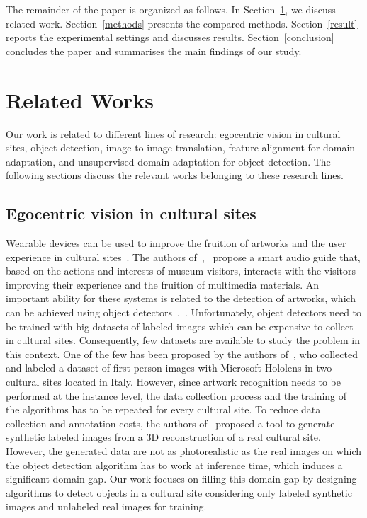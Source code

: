 \documentclass[preprint]{elsarticle}
\begin{document}
The remainder of the paper is organized as follows. In Section~\ref{related}, we discuss related work. Section~\ref{methods} presents the compared methods. Section~\ref{result} reports the experimental settings and discusses results. Section~\ref{conclusion} concludes the paper and summarises the main findings of our study.
\section{Related Works}
\label{related}
Our work is related to different lines of research: egocentric vision in cultural sites, object detection, image to image translation, feature alignment for domain adaptation, and unsupervised domain adaptation for object detection. The following sections discuss the relevant works belonging to these research lines.
\subsection{Egocentric vision in cultural sites}
Wearable devices can be used to improve the fruition of artworks and the user experience in cultural sites~\cite{articlecucchiara}. The authors of~\cite{10.1145/3092832},~\cite{portaz} propose a smart audio guide that, based on the actions and interests of museum visitors, interacts with the visitors improving their experience and the fruition of multimedia materials. An important ability for these systems is related to the detection of artworks, which can be achieved using object detectors~\cite{DBLP:journals/corr/RenHG015},~\cite{DBLP:journals/corr/abs-1708-02002}. Unfortunately, object detectors need to be trained with big datasets of labeled images which can be expensive to collect in cultural sites. Consequently, few datasets are available to study the problem in this context. One of the few has been proposed by the authors of~\cite{Ragusa_2020}, who collected and labeled a dataset of first person images with Microsoft Hololens in two cultural sites located in Italy. However, since artwork recognition needs to be performed at the instance level, the data collection process and the training of the algorithms has to be repeated for every cultural site. To reduce data collection and annotation costs, the authors of~\cite{orlando2020egocentric} proposed a tool to generate synthetic labeled images from a 3D reconstruction of a real cultural site. However, the generated data are not as photorealistic as the real images on which the object detection algorithm has to work at inference time, which induces a significant domain gap. Our work focuses on filling this domain gap by designing algorithms to detect objects in a cultural site considering only labeled synthetic images and unlabeled real images for training.
\end{document}
